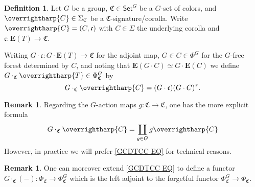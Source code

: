 \documentclass[a4paper,10pt
,draft
]{article}%
\numberwithin{equation}{section}
\numberwithin{figure}{section}
\theoremstyle{definition} %
\newtheorem{definition}[equation]{Definition}%
\newtheorem{remark}[equation]{Remark}%
\newcommand{\vect}[1]{\text{\overrightharp{\ensuremath{#1}}}}
\newcommand{\1}{\ensuremath{\mathbbm 1}}%
\begin{document}
\begin{definition}
Let $G$ be a group,
$\mathfrak{C} \in \mathsf{Set}^G$
be a $G$-set of colors, 
and $\vect{C} \in \Sigma_{\mathfrak{C}}$ be a $\mathfrak{C}$-signature/corolla.
Write
$\vect{C} = (C,\mathfrak{c})$
with $C\in \Sigma$ the underlying corolla
and 
$\mathfrak{c} \colon \boldsymbol{E}(T) \to \mathfrak{C}$.

Writing 
$G \cdot \mathfrak{c} \colon G \cdot \boldsymbol{E}(T) \to \mathfrak{C}$
for the adjoint map, 
$G \in C \in \Phi^G$
for the $G$-free forest determined by $C$,
and noting that
$\boldsymbol{E}(G \cdot C) \simeq 
G \cdot \boldsymbol{E}(C)$
we define $G \cdot_{\mathfrak{C}} \vect{T} \in \Phi^G_{\mathfrak{C}}$ by
\begin{equation}\label{GCDTCC EQ}
G \cdot_{\mathfrak{C}} \vect{C} = 
(G \cdot \mathfrak{c})(G \cdot C)^{\tau}.
\end{equation}
\end{definition}



\begin{remark}
Regarding the $G$-action maps 
$g \colon \mathfrak{C} \to \mathfrak{C}$,
one has the more explicit formula
\[
G \cdot_{\mathfrak{C}} \vect{C}
= 
\coprod_{g \in G}
g \vect{C}
\]
However, in practice
we will prefer \eqref{GCDTCC EQ} for technical reasons.
\end{remark}


\begin{remark}
One can moreover extend \eqref{GCDTCC EQ}
to define a functor
$G \cdot_{\mathfrak{C}} (-) \colon \Phi_{\mathfrak{C}}
\to \Phi_{\mathfrak{C}}^G$
which is the left adjoint to the forgetful functor
$ \Phi_{\mathfrak{C}}^G
\to \Phi_{\mathfrak{C}}$.
\end{remark}
\end{document}
